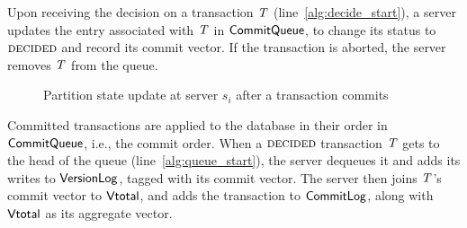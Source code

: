 Upon receiving the decision on a transaction $\mathit{T}$ (line~\ref{alg:decide_start}), a server updates the entry associated with $\mathit{T}$ in $\mathsf{CommitQueue}$, to change its status to $\text{\sc decided}$ and record its commit vector. If the transaction is aborted, the server removes $\mathit{T}$ from the queue.

\begin{figure}[h]
\begin{algorithm}[H]
\end{algorithm}
\caption{Partition state update at server $s_i$ after a transaction commits}
\end{figure}

Committed transactions are applied to the database in their order in $\mathsf{CommitQueue}$, i.e., the commit order. When a $\text{\sc decided}$ transaction $\mathit{T}$ gets to the head of the queue (line~\ref{alg:queue_start}), the server dequeues it and adds its writes to $\mathsf{VersionLog}$, tagged with its commit vector. The server then joins $\mathit{T}$'s commit vector to $\mathsf{Vtotal}$, and adds the transaction to $\mathsf{CommitLog}$, along with $\mathsf{Vtotal}$ as its aggregate vector.
